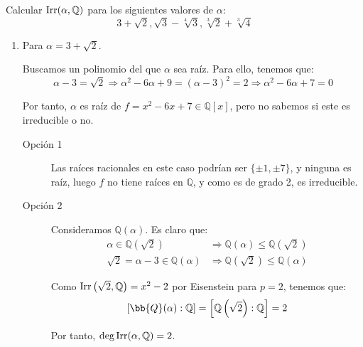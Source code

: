 \begin{ejercicio}
    Calcular $\operatorname{Irr}(\alpha,\mathbb{Q})$ para los siguientes valores de $\alpha$:
    \begin{equation*}
        3+\sqrt{2}, \sqrt{3}-\sqrt[4]{3}, \sqrt[3]{2}+\sqrt[3]{4}
    \end{equation*}

    \begin{enumerate}[label=\alph*)]
        \item Para $\alpha=3+\sqrt{2}$.
        
            Buscamos un polinomio del que $\alpha$ sea raíz. Para ello, tenemos que:
            \begin{equation*}
                \alpha -3 = \sqrt{2} \Longrightarrow \alpha^2 -6\alpha +9 = {(\alpha-3)}^{2}=2 \Longrightarrow \alpha^2 -6\alpha +7 = 0
            \end{equation*}

            Por tanto, $\alpha$ es raíz de $f = x^2-6x+7\in \mathbb{Q}[x]$, pero no sabemos si este es irreducible o no.
            \begin{description}
                \item[Opción 1] Las raíces racionales en este caso podrían ser $\{\pm 1, \pm 7\}$, y ninguna es raíz, luego $f$ no tiene raíces en $\mathbb{Q}$, y como es de grado 2, es irreducible.
                \item[Opción 2] Consideramos $\mathbb{Q}(\alpha)$. Es claro que:
                \begin{align*}
                    \alpha \in \mathbb{Q}(\sqrt{2}) &\Longrightarrow \mathbb{Q}(\alpha)\leq \mathbb{Q}\left(\sqrt{2}\right) \\
                    \sqrt{2} = \alpha - 3 \in \mathbb{Q}(\alpha) &\Longrightarrow \mathbb{Q}\left(\sqrt{2}\right)\leq \mathbb{Q}(\alpha)
                \end{align*}
            
                Como $\operatorname{Irr}\left(\sqrt{2},\mathbb{Q}\right) = x^2-2$ por Eisenstein para $p=2$, tenemos que:
                \begin{equation*}
                    \left[\bb{Q}(\alpha):\mathbb{Q}\right] = \left[\mathbb{Q}\left(\sqrt{2}\right):\mathbb{Q}\right] = 2
                \end{equation*}

                Por tanto, $\deg \operatorname{Irr}(\alpha,\mathbb{Q}) = 2$.
            \end{description}


\end{enumerate}
\end{ejercicio}
